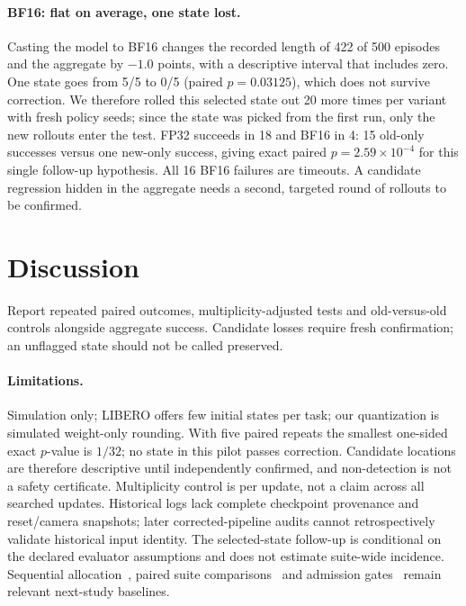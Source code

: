 \documentclass{article}
\begin{document}
\paragraph{BF16: flat on average, one state lost.} Casting the model to BF16 changes the
recorded length of 422 of 500 episodes and the aggregate by $-1.0$ points, with a descriptive interval
that includes zero. One state goes from 5/5 to 0/5 (paired $p=0.03125$), which does not survive
correction. We therefore rolled this selected state out 20 more times per variant with fresh
policy seeds; since the state was picked from the first run, only the new rollouts enter the
test. FP32 succeeds in 18 and BF16 in 4: 15 old-only successes versus one new-only success,
giving exact paired $p=2.59\times10^{-4}$ for this single follow-up hypothesis. All 16
BF16 failures are timeouts. A candidate regression hidden in the aggregate needs a
second, targeted round of rollouts to be confirmed.

\section{Discussion}

Report repeated paired outcomes, multiplicity-adjusted tests and old-versus-old controls
alongside aggregate success. Candidate losses require fresh confirmation; an unflagged
state should not be called preserved.

\paragraph{Limitations.} Simulation only; LIBERO offers few initial states per task; our
quantization is simulated weight-only rounding. With five paired repeats the smallest
one-sided exact $p$-value is $1/32$; no state in this pilot passes correction. Candidate locations
are therefore descriptive until independently confirmed, and non-detection is not a safety
certificate. Multiplicity control is per update, not a claim across all searched updates.
Historical logs lack complete checkpoint provenance and reset/camera snapshots; later
corrected-pipeline audits cannot retrospectively validate historical input identity. The
selected-state follow-up is conditional on the declared evaluator assumptions and does not
estimate suite-wide incidence. Sequential allocation~\citep{snyder2025step}, paired suite
comparisons~\citep{islam2026onnx} and admission gates~\citep{ma2026admission} remain relevant
next-study baselines.

\clearpage

\end{document}

